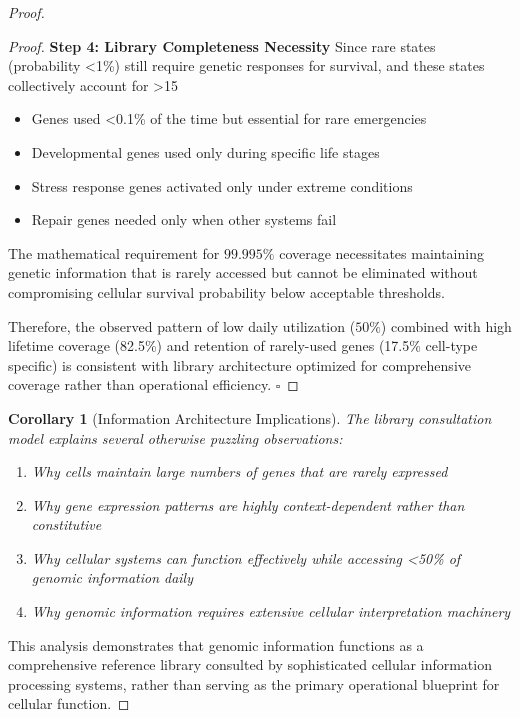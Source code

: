 \documentclass[12pt,a4paper]{article}
\newtheorem{corollary}[theorem]{Corollary}
\begin{document}
\begin{proof}
\begin{proof}
\textbf{Step 4: Library Completeness Necessity}
Since rare states (probability <1\%) still require genetic responses for survival, and these states collectively account for >15%
\begin{itemize}
\item Genes used <0.1\% of the time but essential for rare emergencies
\item Developmental genes used only during specific life stages  
\item Stress response genes activated only under extreme conditions
\item Repair genes needed only when other systems fail
\end{itemize}

The mathematical requirement for $99.995\%$ coverage necessitates maintaining genetic information that is rarely accessed but cannot be eliminated without compromising cellular survival probability below acceptable thresholds.

Therefore, the observed pattern of low daily utilization ($50\%$) combined with high lifetime coverage (82.5\%) and retention of rarely-used genes (17.5\% cell-type specific) is consistent with library architecture optimized for comprehensive coverage rather than operational efficiency. $\square$
\end{proof}

\begin{corollary}[Information Architecture Implications]
The library consultation model explains several otherwise puzzling observations:
\begin{enumerate}
\item Why cells maintain large numbers of genes that are rarely expressed
\item Why gene expression patterns are highly context-dependent rather than constitutive
\item Why cellular systems can function effectively while accessing <50\% of genomic information daily
\item Why genomic information requires extensive cellular interpretation machinery
\end{enumerate}
\end{corollary}

This analysis demonstrates that genomic information functions as a comprehensive reference library consulted by sophisticated cellular information processing systems, rather than serving as the primary operational blueprint for cellular function.


\end{proof}
\end{document}
